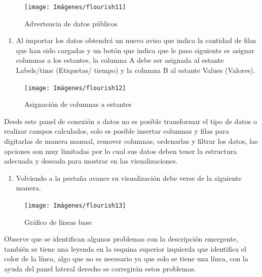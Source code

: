 \documentclass[
]{book}
\providecommand{\tightlist}{%
  \setlength{\itemsep}{0pt}\setlength{\parskip}{0pt}}
\begin{document}
\begin{figure}

{\centering \texttt{[image: Imágenes/flourish11]} 

}

\caption{Advertencia de datos públicos}\label{fig:advertenciadedatospublicosflourish-fig}
\end{figure}

\begin{enumerate}
\def\labelenumi{\arabic{enumi}.}
\setcounter{enumi}{1}
\tightlist
\item
  Al importar los datos obtendrá un nuevo aviso que indica la cantidad de filas que han sido cargadas y un botón que indica que le paso siguiente es asignar columnas a los estantes, la columna A debe ser asignada al estante Labels/time (Etiquetas/ tiempo) y la columna B al estante Values (Valores).
\end{enumerate}

\begin{figure}

{\centering \texttt{[image: Imágenes/flourish12]} 

}

\caption{Asignación de columnas a estantes}\label{fig:asignarcolumnasflourish-fig}
\end{figure}

Desde este panel de conexión a datos no es posible transformar el tipo de datos o realizar campos calculados, solo es posible insertar columnas y filas para digitarlas de manera manual, remover columnas, ordenarlas y filtrar los datos, las opciones son muy limitadas por lo cual sus datos deben tener la estructura adecuada y deseada para mostrar en las visualizaciones.

\begin{enumerate}
\def\labelenumi{\arabic{enumi}.}
\setcounter{enumi}{2}
\tightlist
\item
  Volviendo a la pestaña avance su visualización debe verse de la siguiente manera.
\end{enumerate}

\begin{figure}

{\centering \texttt{[image: Imágenes/flourish13]} 

}

\caption{Gráfico de líneas base}\label{fig:graficolineasbaseflourish-fig}
\end{figure}

Observe que se identifican algunos problemas con la descripción emergente, también se tiene una leyenda en la esquina superior izquierda que identifica el color de la línea, algo que no es necesario ya que solo se tiene una línea, con la ayuda del panel lateral derecho se corregirán estos problemas.
\end{document}
